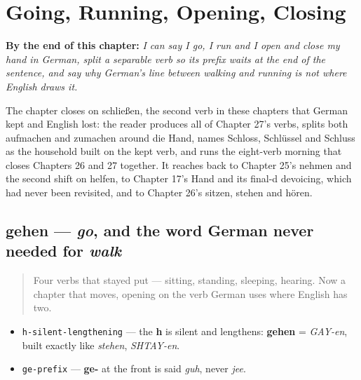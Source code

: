 
\chapter{Going, Running, Opening, Closing}
\label{ch:ge-moving-verbs}

\begin{chapteropening}
\textbf{By the end of this chapter:} \emph{I can say I go, I run and I open and close my hand in German, split a separable verb so its prefix waits at the end of the sentence, and say why German's line between walking and running is not where English draws it.}

The chapter closes on schließen, the second verb in these chapters that German kept and English lost: the reader produces all of Chapter 27's verbs, splits both aufmachen and zumachen around die Hand, names Schloss, Schlüssel and Schluss as the household built on the kept verb, and runs the eight-verb morning that closes Chapters 26 and 27 together. It reaches back to Chapter 25's nehmen and the second shift on helfen, to Chapter 17's Hand and its final-d devoicing, which had never been revisited, and to Chapter 26's sitzen, stehen and hören.
\end{chapteropening}

\section[gehen]{gehen — \emph{go}, and the word German never needed for \emph{walk}}

\label{lesson:GE-C27-gehen}



\begin{quote}
Four verbs that stayed put — sitting, standing, sleeping, hearing. Now a chapter that moves, opening on the verb German uses where English has two.
\end{quote}

\begin{sounds}
\begin{itemize}
\raggedright
  \item \texttt{h-silent-lengthening} — the \textbf{h} is silent and lengthens: \textbf{gehen} = \emph{GAY-en}, built exactly like \emph{stehen}, \emph{SHTAY-en}.
  \item \texttt{ge-prefix} — \textbf{ge-} at the front is said \emph{guh}, never \emph{jee}.
\end{itemize}
\end{sounds}

